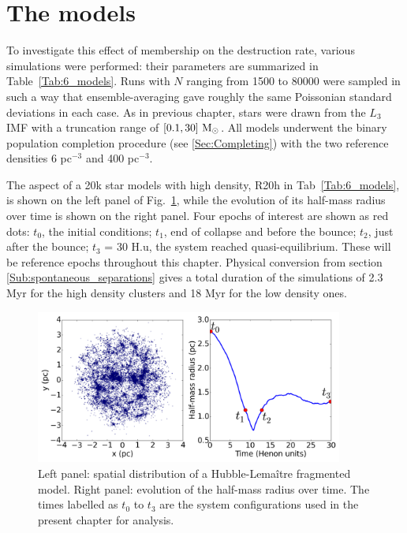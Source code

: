 \section{The models}
\label{Sec:6_models}

To investigate this effect of membership on the destruction rate, various simulations were performed: their parameters are summarized in Table~\ref{Tab:6_models}. Runs with $N$ ranging from 1500 to 80000 were sampled in such a way that ensemble-averaging  gave roughly the same Poissonian standard deviations in each case. As in previous chapter, stars were drawn from the $L_3$ IMF \citep{Maschberger2013} with a truncation range of $[0.1,30]~{\textrm{M}_\odot}$. All models underwent the binary population completion procedure (see \ref{Sec:Completing}) with the two reference densities 6 pc$^{-3}$ and 400 pc$^{-3}$.

The aspect of a 20k star models with high density, R20h in Tab~\ref{Tab:6_models}, is shown on the left panel of Fig.~\ref{Fig:6_Rhm}, while the evolution of its half-mass radius over time is shown on the right panel. Four epochs of interest are shown as red dots: $t_0$, the initial conditions; $t_1$, end of collapse and before the bounce; $t_2$, just after the bounce; $t_3$ = 30 H.u, the system reached quasi-equilibrium. These will be reference epochs throughout this chapter. Physical conversion from section \ref{Sub:spontaneous_separations} gives a total duration of the simulations of 2.3 Myr for the high density clusters and 18 Myr for the low density ones.


\begin{figure}
\begin{center}
\includegraphics[width=0.9\textwidth]{Figures/6_Rhm}
\caption{Left panel: spatial distribution of a Hubble-Lema\^itre fragmented model. Right panel: evolution of the half-mass radius over time. The times labelled as $t_0$ to $t_3$ are the system configurations used in the present chapter for analysis. }
\label{Fig:6_Rhm}
\end{center}
\end{figure}


